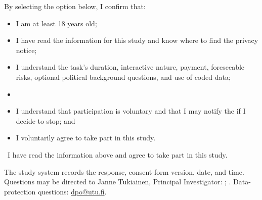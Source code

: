 \begin{infobox}
By selecting the option below, I confirm that:
\begin{itemize}[label=\checkbox]
  \item I am at least 18 years old;
  \item I have read the information for this study and know where to find the privacy notice;
  \item I understand the task's duration, interactive nature, payment, foreseeable risks, optional political background questions, and use of coded data;
  \item {}
  \item I understand that participation is voluntary and that I may notify the  if I decide to stop; and
  \item I voluntarily agree to take part in this study.
\end{itemize}

\medskip
\checkbox\ I have read the information above and agree to take part in this study.
\end{infobox}

The study system records the response, consent-form version, date, and time. Questions may be directed to Janne Tukiainen, Principal Investigator: \StudyEmail; \StudyPhone. Data-protection questions: \href{mailto:dpo@utu.fi}{dpo@utu.fi}.



